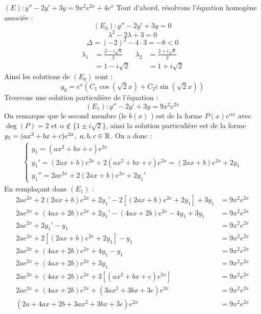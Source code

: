 \begin{example}
    $(E) : y'' - 2y' + 3y = 9x^2 e^{2x} + 4e^x$
    Tout d'abord, résolvons l'équation homogène associée :
    \[ (E_0) : y'' - 2y' + 3y = 0 \]
    \[ \lambda^2 - 2\lambda + 3 = 0 \]
    \[ \Delta = (-2)^2 - 4 \cdot 3 = -8 < 0 \]
    \begin{align*}
        \lambda_1 &= \frac{2 - i\sqrt{8}}{2} & \lambda_2 &= \frac{2 + i\sqrt{8}}{2} \\
        &= 1 - i\sqrt{2} & &= 1 + i\sqrt{2}
    \end{align*}
    Ainsi les solutions de $(E_0)$ sont :
    \[ y_0 = e^x \left(C_1 \cos(\sqrt{2}x) + C_2 i \sin(\sqrt{2}x) \right) \]
    Trouvons une solution particulière de l'équation :
    \[ (E_1) : y'' - 2y' + 3y = 9x^2 e^{2x} \]
    On remarque que le second membre (le \og $b(x)$ \fg) est de la forme $P(x) e^{\alpha x}$ avec $\deg(P) = 2$ et $\alpha \notin \{1 \pm i\sqrt{2}\}$, ainsi la solution particulière est de la forme $y_1 = (ax^2 + bx + c)e^{2x},\ a, b, c \in \mathbb{R}$.
    On a donc :
    \begin{align*}
        \begin{cases}
            y_1 = (ax^2 + bx + c)e^{2x} \\
            y_1' = (2ax + b)e^{2x} + 2(ax^2 + bx + c)e^{2x} = (2ax + b)e^{2x} + 2y_1 \\
            y_1'' = 2a e^{2x} + 2(2ax + b)e^{2x} + 2y_1'
        \end{cases}
    \end{align*}
    En remplaçant dans $(E_1)$ :
    \begin{align*}
        2ae^{2x} + 2(2ax + b)e^{2x} + 2y_1' - 2[(2ax + b)e^{2x} + 2y_1] + 3y_1 &= 9x^2 e^{2x} \\
        2ae^{2x} + (4ax + 2b)e^{2x} + 2y_1' - (4ax + 2b)e^{2x} - 4y_1 + 3y_1 &= 9x^2 e^{2x} \\
        2ae^{2x}+ 2y_1' - y_1 &= 9x^2e^{2x} \\
        2ae^{2x} + 2[(2ax + b)e^{2x} + 2y_1] - y_1 &= 9x^2e^{2x} \\
        2ae^{2x} + (4ax + 2b)e^{2x} + 4 y_1 - y_1 &= 9x^2 e^{2x} \\
        2ae^{2x} + (4ax + 2b)e^{2x} + 3y_1 &= 9x^2e^{2x} \\
        2ae^{2x} + (4ax + 2b)e^{2x} + 3[(ax^2 + bx + c)e^{2x}] &= 9x^2 e^{2x} \\ 
        2ae^{2x} + (4ax + 2b)e^{2x} + (3ax^2 + 3bx + 3c)e^{2x} &= 9x^2 e^{2x} \\
        (2a + 4ax + 2b + 3ax^2 + 3bx + 3c)e^{2x} &= 9x^2 e^{2x} \\

\end{align*}
\end{example}
